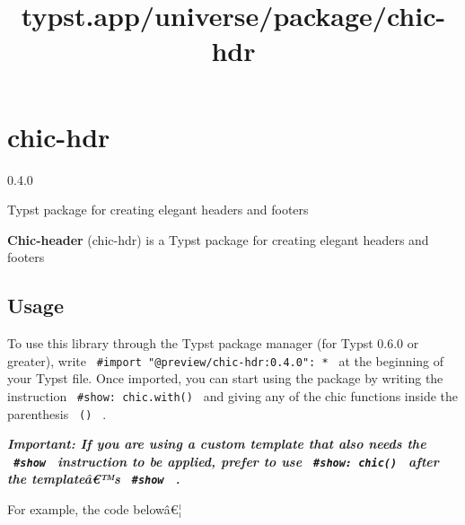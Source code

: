 \title{typst.app/universe/package/chic-hdr}

\label{banner}
\section{chic-hdr}\label{chic-hdr}

{ 0.4.0 }

Typst package for creating elegant headers and footers

\label{readme}
\textbf{Chic-header} (chic-hdr) is a Typst package for creating elegant
headers and footers

\subsection{Usage}\label{usage}

To use this library through the Typst package manager (for Typst 0.6.0
or greater), write \texttt{\ \#import\ "@preview/chic-hdr:0.4.0":\ *\ }
at the beginning of your Typst file. Once imported, you can start using
the package by writing the instruction \texttt{\ \#show:\ chic.with()\ }
and giving any of the chic functions inside the parenthesis
\texttt{\ ()\ } .

\emph{\textbf{Important: If you are using a custom template that also
needs the \texttt{\ \#show\ } instruction to be applied, prefer to use
\texttt{\ \#show:\ chic()\ } after the templateâ€™s \texttt{\ \#show\ }
.}}

For example, the code belowâ€¦

\begin{Shaded}
\begin{Highlighting}[]


\NormalTok{    ),}
\NormalTok{  ),}
\NormalTok{  ),}
\NormalTok{)}


\end{Highlighting}
\end{Shaded}

